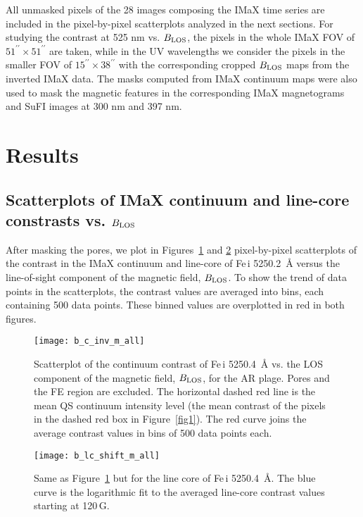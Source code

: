 \documentclass[goettingen, gauss, print]{thesis}
\begin{document}
All unmasked pixels of the 28 images composing the IMaX time series are included in the pixel-by-pixel scatterplots analyzed in the next sections. For studying the contrast at 525 nm vs. $B_{\rm LOS}$, the pixels in the whole IMaX FOV of $51^{\prime\prime}\times51^{\prime\prime}$ are taken, while in the UV wavelengths we consider the pixels in the smaller FOV of $15^{\prime\prime}\times38^{\prime\prime}$ with the corresponding cropped $B_{\rm LOS}$ maps from the inverted IMaX data.
The masks computed from IMaX continuum maps were also used to mask the magnetic features in the corresponding IMaX magnetograms and SuFI images at 300 nm and 397 nm. %


\section{Results}
\label{results}

\subsection{Scatterplots of IMaX continuum and line-core constrasts vs. $B_{\rm LOS}$}
\label{results_imax}
After masking the pores, we plot in Figures~\ref{imax_cont_sp} and \ref{imax_lc_sp} pixel-by-pixel scatterplots of the contrast in the IMaX continuum and line-core of Fe\,{\sc i} 5250.2\, \AA{} versus the line-of-sight component of the magnetic field, $B_{\rm LOS}$. To show the trend of data points in the scatterplots, the contrast values are averaged into bins, each containing 500 data points. These binned values are overplotted in red in both figures.\\

\begin{figure}
\centering
\texttt{[image: b\_c\_inv\_m\_all]}
\caption{Scatterplot of the continuum contrast  of Fe\,{\sc i} 5250.4\, \AA{} vs. the LOS component of the magnetic field, $B_{\rm LOS}$, for the AR plage. Pores and the FE region are excluded. The horizontal dashed red line is the mean QS continuum intensity level (the mean contrast of the pixels in the dashed red box in Figure~\ref{fig1}). The red curve joins the average contrast values in bins of 500 data points each.}
\label{imax_cont_sp}
\end{figure}

\begin{figure}
\centering
 \texttt{[image: b\_lc\_shift\_m\_all]}
\caption{Same as Figure~\ref{imax_cont_sp} but for the line core of Fe\,{\sc i} 5250.4\, \AA{}. The blue curve is the logarithmic fit to the averaged line-core contrast values starting at 120\,G.  }
\label{imax_lc_sp}
\end{figure}
\end{document}
